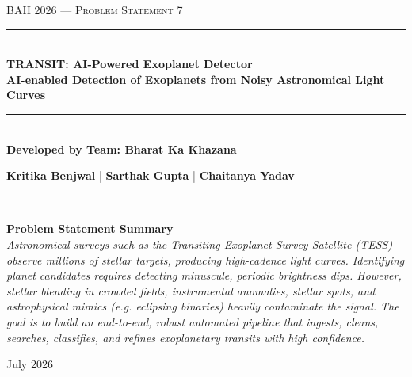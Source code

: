 \documentclass[11pt,a4paper]{article}
\begin{document}
\begin{titlepage}
    \centering
    \vspace*{1.5cm}
    
    {\large\scshape BAH 2026 --- Problem Statement 7}\\[0.5cm]
    \rule{\linewidth}{1.5pt}\\[0.6cm]
    
    {\Huge \bfseries TRANSIT: AI-Powered Exoplanet Detector}\\[0.3cm]
    {\large \bfseries AI-enabled Detection of Exoplanets from Noisy Astronomical Light Curves}\\[0.6cm]
    \rule{\linewidth}{1.5pt}\\[1.5cm]
    
    {\large \bfseries Developed by Team: Bharat Ka Khazana}\\[1.0cm]
    
    \begin{minipage}{0.8\textwidth}
        \centering
        \large
        \textbf{Kritika Benjwal} \quad | \quad \textbf{Sarthak Gupta} \quad | \quad \textbf{Chaitanya Yadav}
    \end{minipage}\\[2.5cm]
    
    \begin{minipage}{0.9\textwidth}
        \centering
        \textbf{\large Problem Statement Summary}\\[0.3cm]
        \textit{Astronomical surveys such as the Transiting Exoplanet Survey Satellite (TESS) observe millions of stellar targets, producing high-cadence light curves. Identifying planet candidates requires detecting minuscule, periodic brightness dips. However, stellar blending in crowded fields, instrumental anomalies, stellar spots, and astrophysical mimics (e.g. eclipsing binaries) heavily contaminate the signal. The goal is to build an end-to-end, robust automated pipeline that ingests, cleans, searches, classifies, and refines exoplanetary transits with high confidence.}
    \end{minipage}
    
    \vfill
    
    {\large July 2026}
\end{titlepage}
\end{document}

